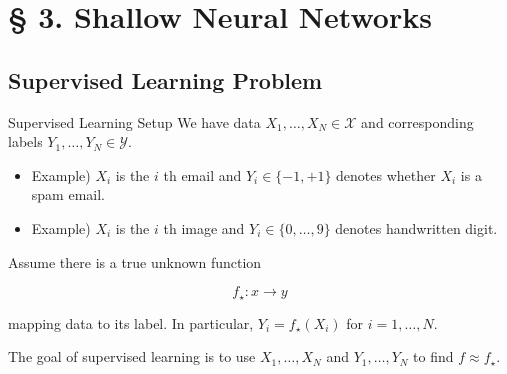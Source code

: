 \section{§ 3. Shallow Neural Networks}

\subsection{Supervised Learning Problem}

\begin{frame}[allowframebreaks]

\begin{mydefinitionblock}{3.1}{Supervised Learning Setup}
    We have data $X_{1}, \ldots, X_{N} \in \mathcal{X}$ and corresponding labels $Y_{1}, \ldots, Y_{N} \in \mathcal{Y}$.

    \begin{itemize}
        \item Example) $X_{i}$ is the $i$ th email and $Y_{i} \in\{-1,+1\}$ denotes whether $X_{i}$ is a spam email.
        \item Example) $X_{i}$ is the $i$ th image and $Y_{i} \in\{0, \ldots, 9\}$ denotes handwritten digit.
    \end{itemize}

    Assume there is a true unknown function

    $$
    f_{\star}: x \rightarrow y
    $$

    mapping data to its label. In particular, $Y_{i}=f_{\star}\left(X_{i}\right)$ for $i=1, \ldots, N$.

    The goal of supervised learning is to use $X_{1}, \ldots, X_{N}$ and $Y_{1}, \ldots, Y_{N}$ to find $f \approx f_{\star}$.
\end{mydefinitionblock}

\end{frame}

